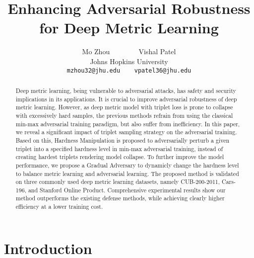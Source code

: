\documentclass[10pt,twocolumn,letterpaper]{article}
\begin{document}
\title{Enhancing Adversarial Robustness for Deep Metric Learning}

\author{Mo Zhou ~~~~~~~ Vishal Patel\\
Johns Hopkins University\\
{\tt\small mzhou32@jhu.edu ~~ vpatel36@jhu.edu}
}
\maketitle

\begin{abstract}
	Deep metric learning, being vulnerable to adversarial
	attacks, has safety and security implications in its applications.
	It is crucial to improve adversarial robustness of deep
	metric learning.
	However, as deep metric model with triplet loss is prone to collapse with
	excessively hard samples, the previous methods refrain from using the
	classical min-max adversarial training paradigm, but also suffer from
	inefficiency.
	In this paper, we reveal a significant impact of triplet sampling strategy
	on the adversarial training.
	Based on this, Hardness Manipulation is proposed to adversarially perturb
	a given triplet into a specified hardness level in min-max adversarial
	training, instead of creating hardest triplets rendering model collapse.
	To further improve the model performance, we propose a Gradual
	Adversary to dynamicly change the hardness level to balance metric
	learning and adversarial learning.
	The proposed method is validated on three commonly
	used deep metric learning datasets, namely CUB-200-2011, Cars-196,
	and Stanford Online Product.
	Comprehensive experimental results show our method outperforms
	the existing defense methods, while achieving clearly higher
	efficiency at a lower training cost.
\end{abstract}

\section{Introduction}
\label{sec:1}
\end{document}
